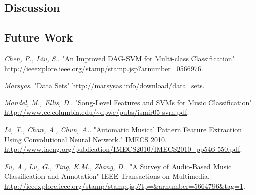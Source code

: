 \documentclass{article} %
\begin{document}
\subsection{Discussion}



\subsection{Future Work}




\begin{thebibliography}{9}
  \emph{Chen, P., Liu, S.}.
  "An Improved DAG-SVM for Multi-class Classification"
  \url{http://ieeexplore.ieee.org/stamp/stamp.jsp?arnumber=0566976}.

  \emph{Marsyas}.
  "Data Sets"
  \url{http://marsysas.info/download/data\_sets}.

  \emph{Mandel, M., Ellis, D.}.
  "Song-Level Features and SVMs for Music Classification"
  \url{http://www.ee.columbia.edu/~dpwe/pubs/ismir05-svm.pdf}.

  \emph{Li, T., Chan, A., Chun, A.}.
  "Automatic Musical Pattern Feature Extraction Using Convolutional Neural Network."
  IMECS 2010.
  \url{http://www.iaeng.org/publication/IMECS2010/IMECS2010\_pp546-550.pdf}.

  \emph{Fu, A., Lu, G., Ting, K.M., Zhang, D.}.
  "A Survey of Audio-Based Music Classification and Annotation"
  IEEE Transactions on Multimedia.
  \url{http://ieeexplore.ieee.org/stamp/stamp.jsp?tp=&arnumber=5664796&tag=1}.

\end{thebibliography}
\end{document}
